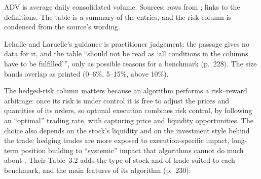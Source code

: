 \begin{qfmethod}
\noindent ADV is average daily consolidated volume. Sources: rows from \citep[sec.~3.4.1, Table~3.1, p.~229]{alpha-laruelle}; links to the definitions. The table is a summary of the entries, and the risk column is condensed from the source's wording.

 Lehalle and Laruelle's guidance is practitioner judgement: the passage gives no data for it, and the table ``should not be read as `all conditions in the columns have to be fulfilled''', only as possible reasons for a benchmark (p.~228). The size bands overlap as printed (0--6\%, 5--15\%, above 10\%).

 The hedged-risk column matters because an algorithm performs a risk--reward arbitrage: once its risk is under control it is free to adjust the prices and quantities of its orders, so optimal execution combines risk control, by following an ``optimal'' trading rate, with capturing price and liquidity opportunities. The choice also depends on the stock's liquidity and on the investment style behind the trade: hedging trades are more exposed to execution-specific impact, long-term position building to ``systemic'' impact that algorithms cannot do much about \citep[sec.~3.4.1, p.~228]{alpha-laruelle}. Their Table~3.2 adds the type of stock and of trade suited to each benchmark, and the main features of its algorithm (p.~230):

\smallskip
{}
\smallskip


\end{qfmethod}
